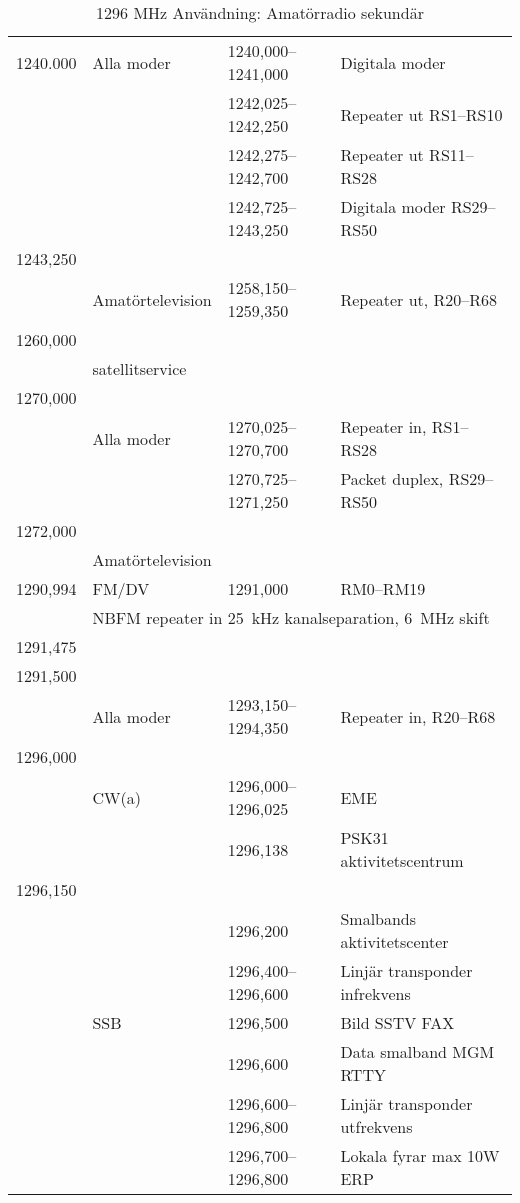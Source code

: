 \setlongtables
\begin{longtable}{llll}
\caption{1296 MHz Användning: Amatörradio sekundär} \\

1240.000 & Alla moder & 1240,000--1241,000 & Digitala moder\\
         & & 1242,025--1242,250 & Repeater ut RS1--RS10\\
         & & 1242,275--1242,700 & Repeater ut RS11--RS28\\
         & & 1242,725--1243,250 & Digitala moder RS29--RS50\\
1243,250 & & & \\
         & Amatörtelevision & 1258,150--1259,350 & Repeater ut, R20--R68 \\
1260,000 & & & \\
         & satellitservice & & \\
1270,000 & & & \\
         & Alla moder & 1270,025--1270,700 & Repeater in, RS1--RS28\\
         &            & 1270,725--1271,250 & Packet duplex, RS29--RS50\\
1272,000 & & &\\
         & Amatörtelevision & &\\
1290,994 & FM/DV & 1291,000 & RM0--RM19\\
         & \multicolumn{3}{l}{NBFM repeater in 25~kHz kanalseparation, 6~MHz skift}\\
1291,475 & & &\\
1291,500 & & &\\
         & Alla moder & 1293,150--1294,350 & Repeater in, R20--R68\\
1296,000 & & &\\
         & CW(a) & 1296,000--1296,025 & EME\\
         & & 1296,138 & PSK31 aktivitetscentrum\\
1296,150 & & & \\
         &     & 1296,200           & Smalbands aktivitetscenter \\
         &     & 1296,400--1296,600 & Linjär transponder infrekvens \\
         & SSB & 1296,500           & Bild SSTV FAX\\
         &     & 1296,600           & Data smalband MGM RTTY\\
         &     & 1296,600--1296,800 & Linjär transponder utfrekvens\\
         &     & 1296,700--1296,800 & Lokala fyrar max 10W ERP\\

\end{longtable}

